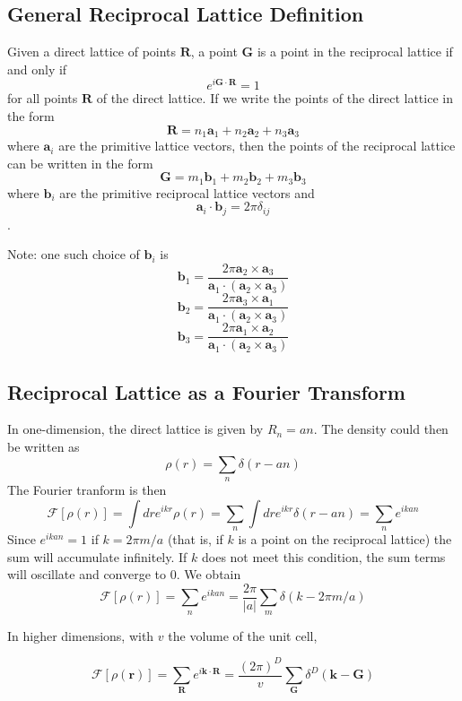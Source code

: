 \documentclass[10pt]{article}
\begin{document}
\subsection{General Reciprocal Lattice Definition}
Given a direct lattice of points $\textbf{R}$, a point $\textbf{G}$ is a point in the reciprocal lattice if and only if
\begin{equation}
  \boxed{e^{i\textbf{G}\cdot \textbf{R}} = 1}
\end{equation}
for all points $\textbf{R}$ of the direct lattice. If we write the points of the direct lattice in the form
$$
\textbf{R} = n_{1}\textbf{a}_{1} + n_{2}\textbf{a}_{2} + n_{3}\textbf{a}_{3}
$$
where $\textbf{a}_{i}$ are the primitive lattice vectors, then the points of the reciprocal lattice can be written in
the form
$$
\textbf{G} = m_{1}\textbf{b}_{1} + m_{2}\textbf{b}_{2} + m_{3}\textbf{b}_{3}
$$
where $\textbf{b}_{i}$ are the primitive reciprocal lattice vectors and $$\textbf{a}_{i}\cdot\textbf{b}_{j} = 2\pi \delta_{ij}$$.


Note: one such choice of $\textbf{b}_{i}$ is
$$
\textbf{b}_{1} = \frac{2\pi \textbf{a}_{2} \times \textbf{a}_{3}}{\textbf{a}_{1} \cdot (\textbf{a}_{2} \times \textbf{a}_{3})}
$$
$$
\textbf{b}_{2} = \frac{2\pi \textbf{a}_{3} \times \textbf{a}_{1}}{\textbf{a}_{1} \cdot (\textbf{a}_{2} \times \textbf{a}_{3})}
$$
$$
\textbf{b}_{3} = \frac{2\pi \textbf{a}_{1} \times \textbf{a}_{2}}{\textbf{a}_{1} \cdot (\textbf{a}_{2} \times \textbf{a}_{3})}
$$

\subsection{Reciprocal Lattice as a Fourier Transform}
In one-dimension, the direct lattice is given by $R_{n} = an$. The density could then be written as
$$\rho(r) = \sum_{n}\delta(r - an)$$
The Fourier tranform is then
$$\mathcal{F}[\rho(r)] = \int dr e^{ikr} \rho(r) = \sum_{n} \int dr e^{ikr} \delta(r-an) = \sum_{n}e^{ikan}$$
Since $e^{ikan} = 1$ if $k = 2\pi m/a$ (that is, if $k$ is a point on the reciprocal lattice) the sum will accumulate infinitely. If $k$ does not meet this condition, the sum terms
will oscillate and converge to 0. We obtain
$$\mathcal{F}[\rho(r)] = \sum_{n}e^{ikan} = \frac{2\pi}{|a|}\sum_{m}\delta(k - 2 \pi m/ a)$$

In higher dimensions, with $v$ the volume of the unit cell,

$$\mathcal{F}[\rho(\textbf{r})] = \sum_{\textbf{R}} e^{i\textbf{k}\cdot\textbf{R}} = \frac{(2\pi)^{D}}{v} \sum_{\textbf{G}} \delta^{D}(\textbf{k} - \textbf{G})$$
\end{document}
